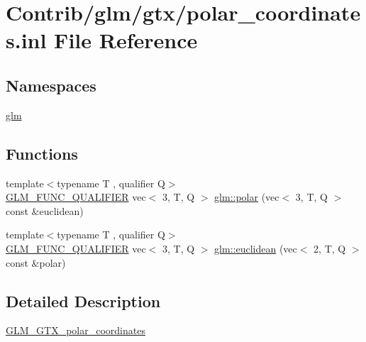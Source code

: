 \hypertarget{polar__coordinates_8inl}{}\section{Contrib/glm/gtx/polar\+\_\+coordinates.inl File Reference}
\label{polar__coordinates_8inl}
\subsection*{Namespaces}
\begin{DoxyCompactItemize}
\item 
 \mbox{\hyperlink{namespaceglm}{glm}}
\end{DoxyCompactItemize}
\subsection*{Functions}
\begin{DoxyCompactItemize}
\item 
{\footnotesize template$<$typename T , qualifier Q$>$ }\\\mbox{\hyperlink{setup_8hpp_a33fdea6f91c5f834105f7415e2a64407}{G\+L\+M\+\_\+\+F\+U\+N\+C\+\_\+\+Q\+U\+A\+L\+I\+F\+I\+ER}} vec$<$ 3, T, Q $>$ \mbox{\hyperlink{group__gtx__polar__coordinates_gab83ac2c0e55b684b06b6c46c28b1590d}{glm\+::polar}} (vec$<$ 3, T, Q $>$ const \&euclidean)
\item 
{\footnotesize template$<$typename T , qualifier Q$>$ }\\\mbox{\hyperlink{setup_8hpp_a33fdea6f91c5f834105f7415e2a64407}{G\+L\+M\+\_\+\+F\+U\+N\+C\+\_\+\+Q\+U\+A\+L\+I\+F\+I\+ER}} vec$<$ 3, T, Q $>$ \mbox{\hyperlink{group__gtx__polar__coordinates_ga1821d5b3324201e60a9e2823d0b5d0c8}{glm\+::euclidean}} (vec$<$ 2, T, Q $>$ const \&polar)
\end{DoxyCompactItemize}


\subsection{Detailed Description}
\mbox{\hyperlink{group__gtx__polar__coordinates}{G\+L\+M\+\_\+\+G\+T\+X\+\_\+polar\+\_\+coordinates}} 